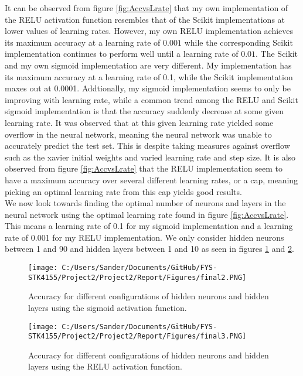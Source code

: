 \documentclass[12pt,a4paper]{article}
\begin{document}
\noindent It can be observed from figure \ref{fig:AccvsLrate} that my own implementation of the RELU activation function resembles that of the Scikit implementations at lower values of learning rates. However, my own RELU implementation achieves its maximum accuracy at a learning rate of $0.001$ while the corresponding Scikit implementation continues to perform well until a learning rate of $0.01$. The Scikit and my own sigmoid implementation are very different. My implementation has its maximum accuracy at a learning rate of 0.1, while the Scikit implementation maxes out at 0.0001. Addtionally, my sigmoid implementation seems to only be improving with learning rate, while a common trend among the RELU and Scikit sigmoid implementation is that the accuracy suddenly decrease at some given learning rate. It was observed that at this given learning rate yielded some overflow in the neural network, meaning the neural network was unable to accurately predict the test set. This is despite taking measures against overflow such as the xavier initial weights and varied learning rate and step size. It is also observed from figure \ref{fig:AccvsLrate} that the RELU implementation seem to have a maximum accuracy over several different learning rates, or a cap, meaning picking an optimal learning rate from this cap yields good results.
\\
We now look towards finding the optimal number of neurons and layers in the neural network using the optimal learning rate found in figure \ref{fig:AccvsLrate}. This means a learning rate of 0.1 for my sigmoid implementation and a learning rate of 0.001 for my RELU implementation. We only consider hidden neurons between 1 and 90 and hidden layers between 1 and 10 as seen in figures \ref{fig:AccvsLrate2} and \ref{fig:AccvsLrate3}.

\begin{figure}[H]
\centering
\texttt{[image: C:/Users/Sander/Documents/GitHub/FYS-STK4155/Project2/Project2/Report/Figures/final2.PNG]}
\caption{\label{fig:AccvsLrate2} Accuracy for different configurations of hidden neurons and hidden layers using the sigmoid activation function.}
\end{figure}

\begin{figure}[H]
\centering
\texttt{[image: C:/Users/Sander/Documents/GitHub/FYS-STK4155/Project2/Project2/Report/Figures/final3.PNG]}
\caption{\label{fig:AccvsLrate3} Accuracy for different configurations of hidden neurons and hidden layers using the RELU activation function.}
\end{figure}
\end{document}
